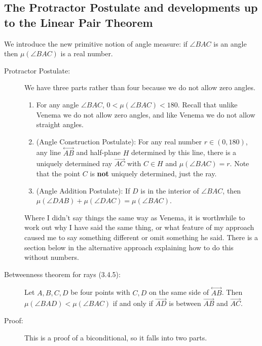 \documentclass[12pt]{article}
\newcommand\Line[1]{\overset{\leftrightarrow}{#1}}
\begin{document}
\subsection{The Protractor Postulate and developments up to the Linear Pair Theorem}

We introduce the new primitive notion of angle measure:  if $\angle BAC$ is an angle then $\mu(\angle BAC)$ is a real number.

\begin{description}

\item[Protractor Postulate:]  We have three parts rather than four because we do not allow zero angles.

\begin{enumerate}

\item For any angle $\angle BAC$, $0<\mu(\angle BAC)<180$.  Recall that unlike Venema we do not allow zero angles, and like Venema we do not allow straight angles.

\item (Angle Construction Postulate):  For any real number $r \in (0,180)$, any line $\Line{AB}$ and half-plane $H$ determined by this line, there is a uniquely determined  ray $\overrightarrow{AC}$ with $C \in H$ and $\mu(\angle BAC)=r$.  Note that the point $C$ is {\bf not} uniquely determined, just the ray.

\item (Angle Addition Postulate):  If $D$ is in the interior of $\angle BAC$, then $\mu(\angle DAB) + \mu(\angle DAC) = \mu(\angle BAC)$.

\end{enumerate}

Where I didn't say things the same way as Venema, it is worthwhile to work out why I have said the same thing, or what feature of my approach caused me to say something different or omit something he said.  There is a section below in the alternative approach explaining how to do this without numbers.



\item[Betweenness theorem for rays (3.4.5):]  Let $A,B,C,D$ be four points with $C,D$ on the same side of
$\Line{AB}$.  Then $\mu(\angle BAD) < \mu(\angle BAC)$ if and only if $\overrightarrow {AD}$ is between
$\overrightarrow{AB}$ and $\overrightarrow{AC}$.

\item[Proof:]  This is a proof of a biconditional, so it falls into two parts.


\end{description}
\end{document}
